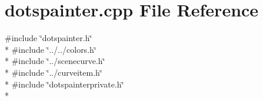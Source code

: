 \section{dotspainter.\+cpp File Reference}
\label{curve_2painters_2dotspainter_8cpp}
{\ttfamily \#include \char`\"{}dotspainter.\+h\char`\"{}}\\*
{\ttfamily \#include \char`\"{}../../colors.\+h\char`\"{}}\\*
{\ttfamily \#include \char`\"{}../scenecurve.\+h\char`\"{}}\\*
{\ttfamily \#include \char`\"{}../curveitem.\+h\char`\"{}}\\*
{\ttfamily \#include \char`\"{}dotspainterprivate.\+h\char`\"{}}\\*
